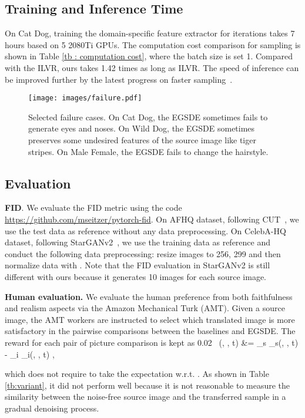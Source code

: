 \documentclass{article}
\def\vx{{\bm{x}}}
\def\vy{{\bm{y}}}
\def\gE{{\mathcal{E}}}
\begin{document}
 \subsection{Training and Inference Time}
 On Cat  Dog, training the domain-specific feature extractor for  iterations takes 7 hours based on 5 2080Ti GPUs. The computation cost comparison for sampling is shown in Table \ref{tb : computation cost}, where the batch size is set 1. Compared with the ILVR, ours takes 1.42 times as long as ILVR. The speed of inference can be improved further by the latest progress on faster sampling~\cite{song2020denoising,bao2021analytic}.
 \begin{figure}
  \centering
  \texttt{[image: images/failure.pdf]}
  \caption{Selected failure cases. On Cat  Dog, the EGSDE sometimes fails to generate eyes and noses. On Wild  Dog, the EGSDE sometimes preserves some undesired features of the source image like tiger stripes. On Male  Female, the EGSDE fails to change the hairstyle. }
  \vspace{-0.5cm}
  \label{fig:failure cases}
\end{figure}
\subsection{Evaluation}
\label{sec:evaluation}
\textbf{FID}. We evaluate the FID metric using the code \href{https://github.com/mseitzer/pytorch-fid}{https://github.com/mseitzer/pytorch-fid}. On AFHQ dataset, following CUT~\cite{park2020contrastive}, we use the test data as reference without any data preprocessing. On CelebA-HQ dataset, following StarGANv2~\cite{park2020contrastive}, we use the training data as reference and conduct the following data preprocessing: resize images to 256, 299 and then normalize data with . Note that the FID evaluation in StarGANv2 is still different with ours because it generates 10 images for each source image.


\textbf{Human evaluation.} We evaluate the human preference from both faithfulness and realism aspects via the Amazon Mechanical Turk (AMT). Given a source image, the AMT workers are instructed to select which translated image is more satisfactory in the pairwise comparisons between the baselines and EGSDE. The reward for each pair of picture comparison is kept as 0.02\
     \label{eq:noisefree}
     \gE(\vy, \vx, t)  
     &= \lambda_s _{s}(\vy, \vx , t) - \lambda_i  _{i}(\vy, \vx , t) ,

which does not require to take the expectation w.r.t. . As shown in Table \ref{tb:variant}, it did not perform well because it is not reasonable to measure the similarity between the noise-free source image and the transferred sample in a gradual denoising process. 
\end{document}

